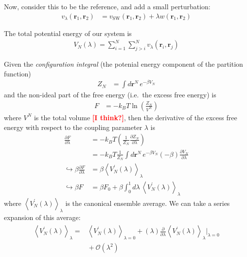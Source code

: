 \documentclass[letterpaper,twocolumn,amsmath,amssymb,prb]{revtex4-1}
\newcommand{\kT}{\ensuremath{k_BT}}
\newcommand{\1}{\ensuremath{\textbf{r}_1}}
\newcommand{\2}{\ensuremath{\textbf{r}_2}}
\newcommand{\fixme}[1]{\textcolor{red}{\textbf{[#1]}}}
\begin{document}
Now, consider this to be the reference, and add a small perturbation:
\begin{align}
  v_\lambda(\1,\2) &= v_\text{SW}(\1,\2) + \lambda w(\1,\2) \label{eqn:small-perturbation}
\end{align}

The total potential energy of our system is
\begin{align}
  V_N(\lambda) = \sum_{i=1}^N\sum_{j>i}^N v_\lambda(\mathbf{r}_i,\mathbf{r}_j)
\end{align}

Given the \emph{configuration integral} (the potenial energy component of the partition function)
\begin{align}
  Z_N &= \int d\mathbf{r}^N\, e^{-\beta V_N}
\end{align}
and the non-ideal part of the free energy (i.e.~the excess free energy) is
\begin{align}
  F &= -\kT\ln\left( \frac{Z_N}{V^N} \right)
\end{align}
where $V^N$ is the total volume \fixme{I think?}, then the derivative of the excess free energy with respect to the coupling parameter $\lambda$ is
\begin{align}
  \frac{\partial F}{\partial\lambda} &= -\kT\left( \frac{1}{Z_N}\frac{\partial Z_N}{\partial\lambda} \right) \\
  &= -\kT\frac{1}{Z_N}\int d\mathbf{r}^N\, e^{-\beta V_N}(-\beta)\frac{\partial V_N}{\partial\lambda} \\
  \hookrightarrow \beta\frac{\partial F}{\partial\lambda} &= \beta\left\langle V_N^{'}(\lambda) \right\rangle_\lambda \\
  \hookrightarrow \beta F &= \beta F_0 + \beta\int_0^1 d\lambda\, \left\langle V_N^{'}(\lambda) \right\rangle_\lambda
\end{align}
where $\left\langle V_N^{'}(\lambda) \right\rangle_\lambda$ is the canonical ensemble average. We can take a series expansion of this average:
\begin{align}\begin{split} %
  \left\langle V_N^{'}(\lambda) \right\rangle_\lambda = &{} \left\langle V_N^{'}(\lambda)\right\rangle_{\lambda = 0} + (\lambda)\frac{\partial}{\partial\lambda}\left\langle V_N^{'}(\lambda) \right\rangle_{\lambda}\bigg|_{\lambda = 0} \\ &{} + \mathcal{O}(\lambda^2)
\end{split}\end{align}
\end{document}
